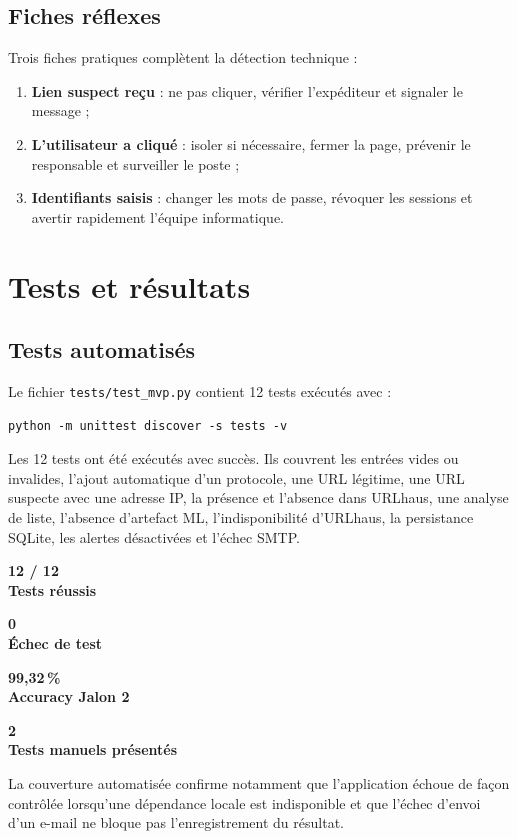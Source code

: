 \documentclass[11pt,a4paper]{report}
\newcommand{\metric}[2]{%
  \begin{minipage}[t]{0.22\textwidth}
    \centering
    \colorbox{cmrpilight}{\parbox[c][1.6cm][c]{0.92\linewidth}{%
      \centering\Large\bfseries\color{cmrpiblue}#1\\[-1mm]
      \normalsize\color{black}#2}}
  \end{minipage}
}
\begin{document}
\section{Fiches réflexes}

Trois fiches pratiques complètent la détection technique :

\begin{enumerate}
  \item \textbf{Lien suspect reçu} : ne pas cliquer, vérifier l'expéditeur
        et signaler le message ;
  \item \textbf{L'utilisateur a cliqué} : isoler si nécessaire, fermer la
        page, prévenir le responsable et surveiller le poste ;
  \item \textbf{Identifiants saisis} : changer les mots de passe, révoquer les
        sessions et avertir rapidement l'équipe informatique.
\end{enumerate}

\chapter{Tests et résultats}

\section{Tests automatisés}

Le fichier \texttt{tests/test\_mvp.py} contient 12 tests exécutés avec :

\begin{lstlisting}[language={},caption={Exécution des tests}]
python -m unittest discover -s tests -v
\end{lstlisting}

Les 12 tests ont été exécutés avec succès. Ils couvrent les entrées vides ou
invalides, l'ajout automatique d'un protocole, une URL légitime, une URL
suspecte avec une adresse IP, la présence et l'absence dans URLhaus, une
analyse de liste, l'absence d'artefact ML, l'indisponibilité d'URLhaus, la
persistance SQLite, les alertes désactivées et l'échec SMTP.

\begin{center}
\metric{12 / 12}{Tests réussis}\hfill
\metric{0}{Échec de test}\hfill
\metric{99,32\,\%}{Accuracy Jalon 2}\hfill
\metric{2}{Tests manuels présentés}
\end{center}

\vspace{0.6cm}

La couverture automatisée confirme notamment que l'application échoue de
façon contrôlée lorsqu'une dépendance locale est indisponible et que l'échec
d'envoi d'un e-mail ne bloque pas l'enregistrement du résultat.
\end{document}
